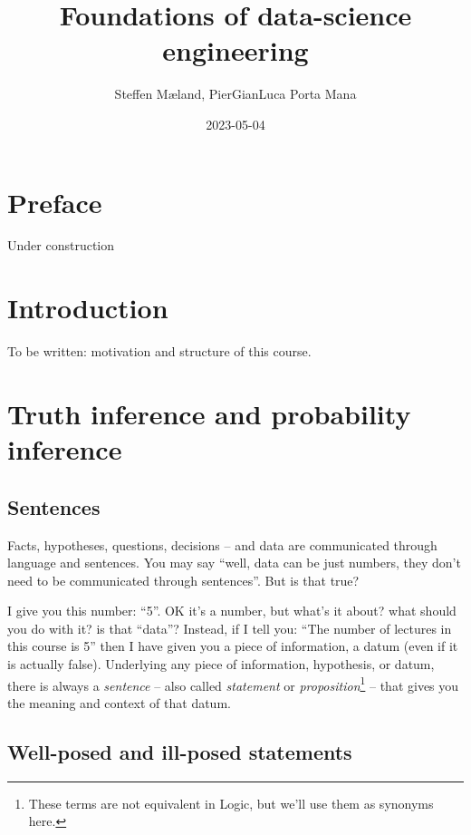 \documentclass[]{book}
\title{Foundations of data-science engineering}
\author{Steffen Mæland, PierGianLuca Porta Mana}
\date{2023-05-04}
\begin{document}
\maketitle

{
\setcounter{tocdepth}{1}
\tableofcontents
}
\hypertarget{preface}{%
\chapter*{Preface}\label{preface}}

Under construction

\hypertarget{intro}{%
\chapter{Introduction}\label{intro}}

To be written: motivation and structure of this course.

\hypertarget{truth-inference-and-probability-inference}{%
\chapter{Truth inference and probability inference}\label{truth-inference-and-probability-inference}}

\hypertarget{sentences}{%
\section{Sentences}\label{sentences}}

Facts, hypotheses, questions, decisions -- and data are communicated through language and sentences. You may say ``well, data can be just numbers, they don't need to be communicated through sentences''. But is that true?

I give you this number: ``5''. OK it's a number, but what's it about? what should you do with it? is that ``data''? Instead, if I tell you: ``The number of lectures in this course is 5'' then I have given you a piece of information, a datum (even if it is actually false). Underlying any piece of information, hypothesis, or datum, there is always a \emph{sentence} -- also called \emph{statement} or \emph{proposition}\footnote{These terms are not equivalent in Logic, but we'll use them as synonyms here.} -- that gives you the meaning and context of that datum.

\hypertarget{well-posed-and-ill-posed-statements}{%
\section{Well-posed and ill-posed statements}\label{well-posed-and-ill-posed-statements}}
\end{document}
